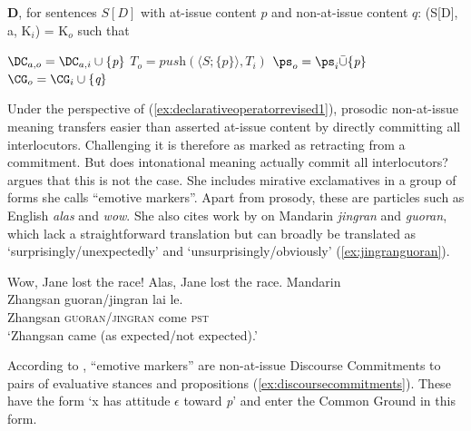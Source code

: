 \begin{exe}
\ex\label{ex:declarativeoperatorrevised1}\textbf{D}, for sentences $S[D]$ with at-issue content $p$ and non-at-issue content $q$:
(S[D], a, K$_{i}$) = K$_{o}$ such that
\begin{xlist}
	\ex $\DC_{a,o} = \DC_{a,i}\cup\{\textit{p}\}$ 
	\ex $T_{o} = \textit{push}(\langle S; \lbrace p \rbrace\rangle, T_{i})$
	\ex $\ps_{o} = \ps_{i}\bar{\cup}\{\textit{p}\}$ 
	\ex $\CG_{o} = \CG_{i} \cup \{\textit{q}\}$ 
\end{xlist}
\end{exe}

Under the perspective of (\ref{ex:declarativeoperatorrevised1}), prosodic non-at-issue meaning transfers easier than asserted at-issue content by directly committing all interlocutors. Challenging it is therefore as marked as retracting from a commitment. But does intonational meaning actually commit all interlocutors? \citet{Rett.2021emotivemarkers} argues that this is not the case. She includes mirative exclamatives in a group of forms she calls “emotive markers”. Apart from prosody, these are particles such as English \textit{alas} and \textit{wow}. She also cites work by \citet{Wu.2008} on Mandarin \textit{jingran} and \textit{guoran}, which lack a straightforward translation but can broadly be translated as `surprisingly/unexpectedly' and `unsurprisingly/obviously' (\ref{ex:jingranguoran}). 

\begin{exe} 
	\ex \label{ex:jingranguoran}
	\begin{xlist}
		\ex Wow, Jane lost the race! 
		\ex Alas, Jane lost the race.
		\ex Mandarin\\
			\gll Zhangsan guoran/jingran lai le.\\
			     Zhangsan \textsc{guoran}/\textsc{jingran} come \textsc{pst} \\
			\glt `Zhangsan came (as expected/not expected).'
	\end{xlist}
\end{exe}

According to \citet[326]{Rett.2021emotivemarkers}, ``emotive markers'' are non-at-issue Discourse Commitments to pairs of evaluative stances and propositions (\ref{ex:discoursecommitments}). These have the form `x has attitude $\epsilon$ toward \textit{p}' and enter the Common Ground in this form.

